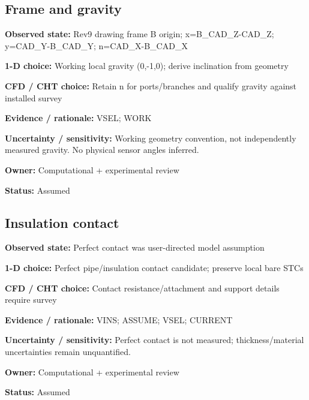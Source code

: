 \documentclass[11pt]{article}
\begin{document}
\par\noindent\begin{minipage}{\textwidth}\small\setlength{\parskip}{2pt}
\subsection*{Frame and gravity}
\textbf{Observed state:} Rev9 drawing frame B origin; x=B\_\allowbreak{}CAD\_\allowbreak{}Z-CAD\_\allowbreak{}Z; y=CAD\_\allowbreak{}Y-B\_\allowbreak{}CAD\_\allowbreak{}Y; n=CAD\_\allowbreak{}X-B\_\allowbreak{}CAD\_\allowbreak{}X\par
\textbf{1-D choice:} Working local gravity (0,-1,0); derive inclination from geometry\par
\textbf{CFD / CHT choice:} Retain n for ports/branches and qualify gravity against installed survey\par
\textbf{Evidence / rationale:} VSEL; WORK\par
\textbf{Uncertainty / sensitivity:} Working geometry convention, not independently measured gravity. No physical sensor angles inferred.\par
\textbf{Owner:} Computational + experimental review\par
\textbf{Status:} Assumed\par
\end{minipage}\par\vspace{5pt}
\par\noindent\begin{minipage}{\textwidth}\small\setlength{\parskip}{2pt}
\subsection*{Insulation contact}
\textbf{Observed state:} Perfect contact was user-directed model assumption\par
\textbf{1-D choice:} Perfect pipe/insulation contact candidate; preserve local bare STCs\par
\textbf{CFD / CHT choice:} Contact resistance/attachment and support details require survey\par
\textbf{Evidence / rationale:} VINS; ASSUME; VSEL; CURRENT\par
\textbf{Uncertainty / sensitivity:} Perfect contact is not measured; thickness/material uncertainties remain unquantified.\par
\textbf{Owner:} Computational + experimental review\par
\textbf{Status:} Assumed\par
\end{minipage}\par\vspace{5pt}
\end{document}
